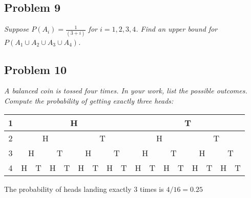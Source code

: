 \documentclass[a4paper,man,natbib]{apa6}
\begin{document}
\subsection{Problem 9}
\emph{Suppose $P(A_i )= \frac{1}{(3+i)}$ for $i=1,2,3,4$. 
	Find an upper bound for $P(A_1 \cup A_2 \cup A_3 \cup A_4)$. }\vspace{1em}

\subsection{Problem 10}
\emph{A balanced coin is tossed four times. In your work, list the possible outcomes. Compute the probability of getting exactly three heads:} \vspace{1em}

\begin{tabular}{|c|cccccccc|cccccccc|}
	\hline
	1 &
	\multicolumn{8}{c|}{H} &
	\multicolumn{8}{c|}{T} \\ \hline
	2 &
	\multicolumn{4}{c|}{H} &
	\multicolumn{4}{c|}{T} &
	\multicolumn{4}{c|}{H} &
	\multicolumn{4}{c|}{T} \\ \hline
	3 &
	\multicolumn{2}{c|}{H} &
	\multicolumn{2}{c|}{T} &
	\multicolumn{2}{c|}{H} &
	\multicolumn{2}{c|}{T} &
	\multicolumn{2}{c|}{H} &
	\multicolumn{2}{c|}{T} &
	\multicolumn{2}{c|}{H} &
	\multicolumn{2}{c|}{T} \\ \hline
	4 &
	\multicolumn{1}{c|}{H} &
	\multicolumn{1}{c|}{\cellcolor[HTML]{34FF34}T} &
	\multicolumn{1}{c|}{\cellcolor[HTML]{34FF34}H} &
	\multicolumn{1}{c|}{T} &
	\multicolumn{1}{c|}{\cellcolor[HTML]{34FF34}H} &
	\multicolumn{1}{c|}{T} &
	\multicolumn{1}{c|}{H} &
	T &
	\multicolumn{1}{c|}{\cellcolor[HTML]{34FF34}H} &
	\multicolumn{1}{c|}{T} &
	\multicolumn{1}{c|}{H} &
	\multicolumn{1}{c|}{T} &
	\multicolumn{1}{c|}{H} &
	\multicolumn{1}{c|}{T} &
	\multicolumn{1}{c|}{H} &
	T \\ \hline
\end{tabular}

\vspace{1em}
The probability of heads landing exactly 3 times is $4/16 = 0.25$


\end{document}
